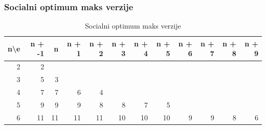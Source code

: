 \documentclass[12pt, hyperref={unicode}]{beamer}
\begin{document}
\begin{frame}

  \frametitle{Socialni optimum maks verzije}
  \begin{table}
  \tiny
  \begin{tabular}{rrrrrrrrrrrr}
\hline
   n\textbackslash{}e &   n + -1 &   n  &   n + 1 &   n + 2 &   n + 3 &   n + 4 &   n + 5 &   n + 6 &   n + 7 &   n + 8 &   n + 9 \\
\hline
     2 &        2 &         &         &         &         &         &         &         &         &         &         \\
     3 &        5 &       3 &         &         &         &         &         &         &         &         &         \\
     4 &        7 &       7 &       6 &       4 &         &         &         &         &         &         &         \\
     5 &        9 &       9 &       9 &       8 &       8 &       7 &       5 &         &         &         &         \\
     6 &       11 &      11 &      11 &      11 &      10 &      10 &      10 &       9 &       9 &       8 &       6 \\
\hline
\end{tabular}
\caption{Socialni optimum maks verzije}
\end{table}

\end{frame}
\end{document}
